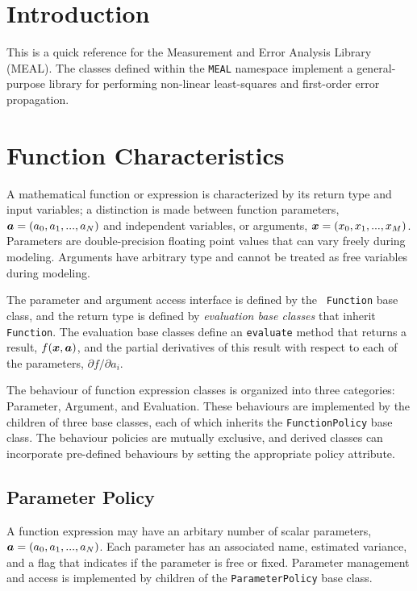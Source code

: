 \documentclass[12pt]{article}
\newcommand{\mbf}[1]{\mbox{\boldmath $#1$}}
\begin{document}
\section{Introduction}

This is a quick reference for the Measurement and Error Analysis
Library (MEAL).  The classes defined within the {\tt MEAL} namespace
implement a general-purpose library for performing non-linear
least-squares and first-order error propagation.

\section{Function Characteristics}

A mathematical function or expression is characterized by its return
type and input variables; a distinction is made between function
parameters, ${\mbf a}=(a_0, a_1, ... , a_N)$ and independent
variables, or arguments, ${\mbf x}=(x_0, x_1, ... , x_M)$.  Parameters
are double-precision floating point values that can vary freely during
modeling.  Arguments have arbitrary type and cannot be treated as free
variables during modeling.

The parameter and argument access interface is defined by the {\tt
Function} base class, and the return type is defined by {\em
evaluation base classes} that inherit {\tt Function}.  The evaluation
base classes define an {\tt evaluate} method that returns a result,
$f({\mbf x},{\mbf a})$, and the partial derivatives of this result
with respect to each of the parameters, $\partial f/\partial a_i$.

The behaviour of function expression classes is organized into
three categories: Parameter, Argument, and Evaluation.  These
behaviours are implemented by the children of three base classes, 
each of which inherits the {\tt FunctionPolicy} base class.  
The behaviour policies are mutually exclusive, and derived classes can 
incorporate pre-defined behaviours by setting the appropriate 
policy attribute.

\subsection{Parameter Policy}

A function expression may have an arbitary number of scalar parameters,
$\mbf{a}=(a_0, a_1, ... , a_N)$.  Each parameter has an associated
name, estimated variance, and a flag that indicates if the parameter
is free or fixed.  Parameter management and access is implemented by
children of the {\tt ParameterPolicy} base class.
\end{document}
